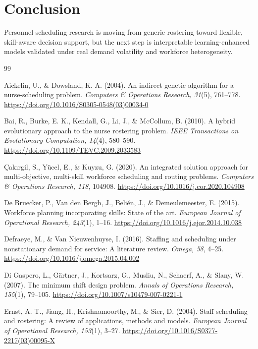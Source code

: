 \documentclass[12pt]{article}
\begin{document}
\section{Conclusion}

Personnel scheduling research is moving from generic rostering toward flexible, skill-aware decision support, but the next step is interpretable learning-enhanced models validated under real demand volatility and workforce heterogeneity.

\renewcommand{\refname}{References}
\begin{thebibliography}{99}

Aickelin, U., \& Dowsland, K. A. (2004).
An indirect genetic algorithm for a nurse-scheduling problem.
\textit{Computers \& Operations Research, 31}(5), 761--778.
\url{https://doi.org/10.1016/S0305-0548(03)00034-0}

Bai, R., Burke, E. K., Kendall, G., Li, J., \& McCollum, B. (2010).
A hybrid evolutionary approach to the nurse rostering problem.
\textit{IEEE Transactions on Evolutionary Computation, 14}(4), 580--590.
\url{https://doi.org/10.1109/TEVC.2009.2033583}

\c{C}ak{\i}rgil, S., Y\"ucel, E., \& Kuyzu, G. (2020).
An integrated solution approach for multi-objective, multi-skill workforce scheduling and routing problems.
\textit{Computers \& Operations Research, 118}, 104908.
\url{https://doi.org/10.1016/j.cor.2020.104908}

De Bruecker, P., Van den Bergh, J., Beli\'en, J., \& Demeulemeester, E. (2015).
Workforce planning incorporating skills: State of the art.
\textit{European Journal of Operational Research, 243}(1), 1--16.
\url{https://doi.org/10.1016/j.ejor.2014.10.038}

Defraeye, M., \& Van Nieuwenhuyse, I. (2016).
Staffing and scheduling under nonstationary demand for service: A literature review.
\textit{Omega, 58}, 4--25.
\url{https://doi.org/10.1016/j.omega.2015.04.002}

Di Gaspero, L., G\"artner, J., Kortsarz, G., Musliu, N., Schaerf, A., \& Slany, W. (2007).
The minimum shift design problem.
\textit{Annals of Operations Research, 155}(1), 79--105.
\url{https://doi.org/10.1007/s10479-007-0221-1}

Ernst, A. T., Jiang, H., Krishnamoorthy, M., \& Sier, D. (2004).
Staff scheduling and rostering: A review of applications, methods and models.
\textit{European Journal of Operational Research, 153}(1), 3--27.
\url{https://doi.org/10.1016/S0377-2217(03)00095-X}


\end{thebibliography}
\end{document}
